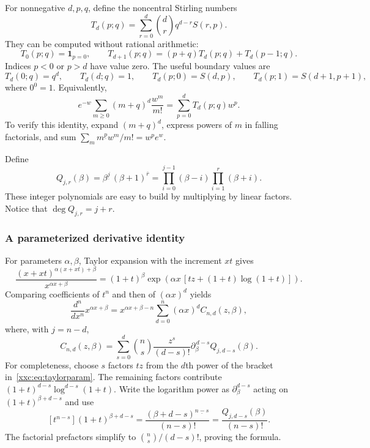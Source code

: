 \documentclass[11pt,a4paper]{article}
\numberwithin{equation}{section}
\theoremstyle{definition}
\theoremstyle{remark}
\theoremstyle{plain}
\newcommand{\fall}[2]{#1^{\underline{#2}}}
\newcommand{\rise}[2]{#1^{\overline{#2}}}
\begin{document}
For nonnegative $d,p,q$, define the noncentral Stirling numbers
\begin{equation}\label{xxc:eq:Tdef}
 T_d(p;q)=\sum_{r=0}^d\binom dr q^{d-r}S(r,p).
\end{equation}
They can be computed without rational arithmetic:
\begin{equation}\label{xxc:eq:Trec}
 T_0(p;q)=\mathbf1_{p=0},\qquad
 T_{d+1}(p;q)=(p+q)T_d(p;q)+T_d(p-1;q).
\end{equation}
Indices $p<0$ or $p>d$ have value zero. The useful boundary values are
\[
 T_d(0;q)=q^d,\qquad T_d(d;q)=1,\qquad
 T_d(p;0)=S(d,p),\qquad T_d(p;1)=S(d+1,p+1),
\]
where $0^0=1$. Equivalently,
\begin{equation}\label{xxc:eq:Tmoment}
 e^{-w}\sum_{m\ge0}(m+q)^d\frac{w^m}{m!}
 =\sum_{p=0}^dT_d(p;q)w^p.
\end{equation}
To verify this identity, expand $(m+q)^d$, express powers of $m$ in falling
factorials, and sum $\sum_m\fall{m}{p}w^m/m!=w^pe^w$.

Define
\begin{equation}\label{xxc:eq:Qdef}
 Q_{j,r}(\beta)=\fall{\beta}{j}\,\rise{(\beta+1)}{r}
 =\prod_{i=0}^{j-1}(\beta-i)\prod_{i=1}^{r}(\beta+i).
\end{equation}
These integer polynomials are easy to build by multiplying by linear
factors. Notice that $\deg Q_{j,r}=j+r$.

\subsubsection{A parameterized derivative identity}

For parameters $\alpha,\beta$, Taylor expansion with the increment $xt$ gives
\begin{equation}\label{xxc:eq:taylorparam}
 \frac{(x+xt)^{\alpha(x+xt)+\beta}}{x^{\alpha x+\beta}}
 =(1+t)^\beta
 \exp\!\left(\alpha x\,[tz+(1+t)\log(1+t)]\right).
\end{equation}
Comparing coefficients of $t^n$ and then of $(\alpha x)^d$ yields
\begin{equation}\label{xxc:eq:parameteridentity}
 \frac{d^n}{dx^n}x^{\alpha x+\beta}
 =x^{\alpha x+\beta-n}\sum_{d=0}^n(\alpha x)^d
 C_{n,d}(z,\beta),
\end{equation}
where, with $j=n-d$,
\begin{equation}\label{xxc:eq:Cformula}
 C_{n,d}(z,\beta)
 =\sum_{s=0}^d\binom ns\frac{z^s}{(d-s)!}
 \partial_\beta^{\,d-s}Q_{j,d-s}(\beta).
\end{equation}
For completeness, choose $s$ factors $tz$ from the $d$th power of the bracket
in~\eqref{xxc:eq:taylorparam}. The remaining factors contribute
$(1+t)^{d-s}\log^{d-s}(1+t)$. Write the logarithm power as
$\partial_\beta^{d-s}$ acting on $(1+t)^{\beta+d-s}$ and use
\[
 [t^{n-s}](1+t)^{\beta+d-s}
 =\frac{\fall{(\beta+d-s)}{n-s}}{(n-s)!}
 =\frac{Q_{j,d-s}(\beta)}{(n-s)!}.
\]
The factorial prefactors simplify to $\binom ns/(d-s)!$, proving the formula.
\end{document}
